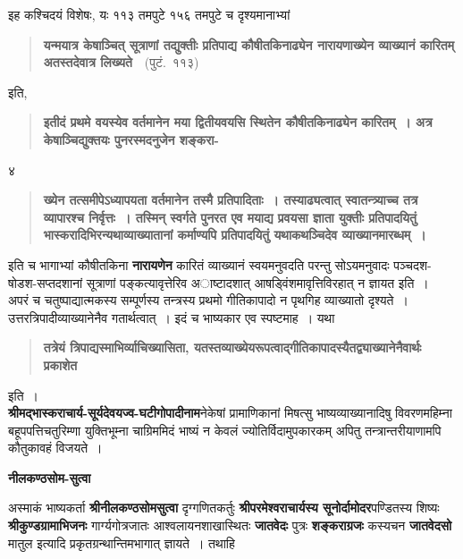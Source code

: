 \documentclass[11pt, openany]{book}
\begin{document}
\indent इह कश्चिदयं विशेषः, यः ११३ तमपुटे १५६ तमपुटे च दृश्यमानाभ्यां

\begin{quote} 
\textbf{यन्मयात्र केषाञ्चित् सूत्राणां तद्युक्तीः प्रतिपाद्य
कौषीतकिनाढ्येन नारायणाख्येन व्याख्यानं कारितम् अतस्तदेवात्र लिख्यते}~~(पुटं.~११३)
\end{quote} 
इति,

\begin{quote} 
\textbf{इतीदं प्रथमे वयस्येव वर्तमानेन मया द्वितीयवयसि स्थितेन कौषीतकिनाढ्येन कारितम्~। अत्र केषाञ्चिद्युक्तयः पुनरस्मदनुजेन शङ्करा-}
\end{quote}
\newpage

\begin{center} ४ \end{center}
\thispagestyle{empty}
\begin{quote}
\textbf{ख्येन तत्समीपेऽध्यापयता वर्तमानेन तस्मै प्रतिपादिताः~। तस्याढ्यत्वात् स्वातन्त्र्याच्च तत्र व्यापारश्च निर्वृत्तः~। तस्मिन्
स्वर्गते पुनरत एव मयाद्य प्रवयसा ज्ञाता युक्तीः प्रतिपादयितुं भास्करादिभिरन्यथाव्याख्यातानां कर्माण्यपि प्रतिपादयितुं यथाकथञ्चिदेव व्याख्यानमारब्धम्~।}
\end{quote}

\noindent इति च भागाभ्यां कौषीतकिना \textbf{नारायणेन} कारितं व्याख्यानं स्वयमनुवदति परन्तु सोऽयमनुवादः पञ्चदश-षोडश-सप्तदशानां सूत्राणां पङ्कत्यावृत्तेरिव अाष्टादशात् आषड्विंशमावृत्तिविरहात् न ज्ञायत इति~। \\

अपरं च चतुष्पाद्यात्मकस्य सम्पूर्णस्य तन्त्रस्य प्रथमो गीतिकापादो न पृथगिह व्याख्यातो दृश्यते~। उत्तरत्रिपादीव्याख्यानेनैव गतार्थत्वात्~।
इदं च भाष्यकार एव स्पष्टमाह~। यथा\textendash 

\begin{quote} 
\textbf{तत्रेयं त्रिपाद्यस्माभिर्व्याचिख्यासिता, यतस्तव्याख्येयरूपत्वाद्गीतिकापादस्यैतद्व्याख्यानेनैवार्थः प्रकाशेत}
\end{quote} 

\noindent इति~। \\

\textbf{श्रीमद्भास्कराचार्य-सूर्यदेवयज्व-घटीगोपादीनाम}नेकेषां प्रामाणिकानां मिषत्सु भाष्यव्याख्यानादिषु विवरणमहिम्ना बहूपपत्तिचतुरिम्णा
युक्तिभूम्ना चाग्रिममिदं भाष्यं न केवलं ज्योतिर्विदामुपकारकम् अपितु तन्त्रान्तरीयाणामपि कौतुकावहं विजयते~। 

\begin{minipage}[t]{0.15\textwidth}
\vspace{.8cm}
\textbf{नीलकण्ठसोम-सुत्वा}
\end{minipage} 
\begin{minipage}[t]{0.55\textwidth} 
अस्माकं भाष्यकर्ता \textbf{श्रीनीलकण्ठसोमसुत्वा} दृग्गणितकर्तुः \textbf{श्रीपरमेश्वराचार्यस्य सूनोर्दामोदर}पण्डितस्य शिष्यः \textbf{श्रीकुण्डग्रामाभिजनः} गार्ग्यगोत्रजातः आश्वलायनशाखास्थितः \textbf{जातवेदः} पुत्रः \textbf{शङ्कराग्रजः} कस्यचन \textbf{जातवेदसो} मातुल इत्यादि प्रकृतग्रन्थान्तिमभागात् ज्ञायते~। तथाहि\textendash 
\end{minipage}
\end{document}

